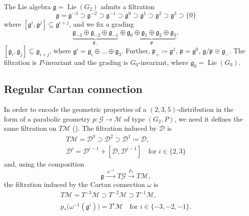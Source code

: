\documentclass{amsart}
\theoremstyle{plain}
\theoremstyle{definition}
\theoremstyle{remark}
\newcommand{\xlra}[1]{\xrightarrow{\ #1\ }}
\newcommand{\mc}[1]{\mathcal{#1}}
\newcommand{\mfk}[1]{\mathfrak{#1}}
\newcommand{\on}[1]{\operatorname{#1}}
\begin{document}
The Lie algebra $\mfk{g} = \on{Lie}(G_2)$ admits a filtration
%
\begin{equation}\label{filtration_on_g}
    \mfk{g} = \mfk{g}^{-3} \supset \mfk{g}^{-2} \supset \mfk{g}^{-1} \supset \mfk{g}^{0} \supset \mfk{g}^{1} \supset \mfk{g}^{2} \supset \mfk{g}^{3} \supset \{0\}
\end{equation}
%
where $[\mfk{g}^i,\mfk{g}^j] \subseteq \mfk{g}^{i+j}$, and we fix a grading
\begin{equation}\label{grading_of_g}
    \underbrace{\mfk{g}_{-3} \oplus \mfk{g}_{-2} \oplus \mfk{g}_{-1}}_{\mfk{g}_-} \oplus \underbrace{\mfk{g}_{0} \oplus \mfk{g}_{1} \oplus \mfk{g}_{2} \oplus \mfk{g}_{3}}_{\mfk{p}},
\end{equation}
%
$[\mfk{g}_i,\mfk{g}_j] \subseteq \mfk{g}_{i+j}$, where $\mfk{g}^i = \mfk{g}_i \oplus \dots \oplus \mfk{g}_3$. Further, $\mfk{p}_+ \coloneqq \mfk{g}^1$, $\mfk{p} = \mfk{g}^0$, $\mfk{g}/\mfk{p} \cong \mfk{g}_-$. The filtration is $P$-invariant and the grading is $G_0$-invariant, where $\mfk{g}_0 = \on{Lie}(G_0)$.

\subsection{Regular Cartan connection}
In order to encode the geometric properties of a $(2,3,5)$-distribution in the form of a parabolic geometry $p\colon \mc{G} \to \mc{M}$ of type $(G_2,P)$, we need it defines the same filtration on $T\mc{M}$ (\cite[pp.-270]{parabook}). The filtration induced by $\mc{D}$ is
\begin{equation}\label{filtration_by_D}
    \begin{gathered}
        T\mc{M} = \mc{D}^3 \supset \mc{D}^2 \supset \mc{D}^1 \coloneqq \mc{D},\\
        \mc{D}^i = \mc{D}^{i-1} + [\mc{D}, \mc{D}^{i-1}] \quad \text{for } i\in \{2,3\}
    \end{gathered}
\end{equation}
and, using the composition
\begin{equation*}
    \mfk{g} \xlra{\omega^{-1}} T\mc{G} \xlra{p_*} T\mc{M},
\end{equation*}
the filtration induced by the Cartan connection $\omega$ is
\begin{equation}\label{filtration}
    \begin{gathered}
        T\mc{M} = T^{-3}\mc{M} \supset T^{-2}\mc{M} \supset T^{-1}\mc{M},\\
        p_* \bigl( \omega^{-1} (\mfk{g}^i) \bigr) = T^{i}\mc{M} \quad \text{for } i\in \{-3,-2,-1\}.
    \end{gathered}
\end{equation}
\end{document}
